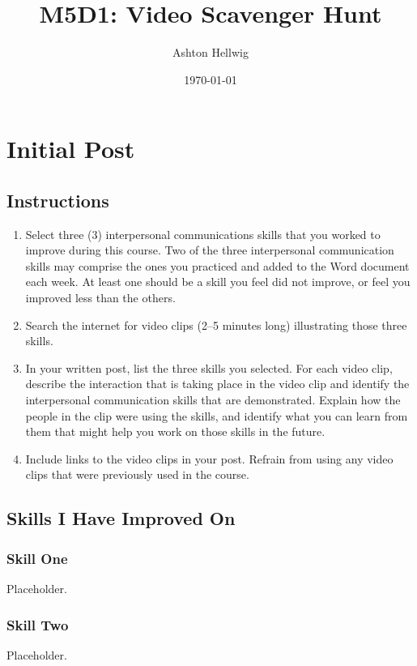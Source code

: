 \documentclass[stu,12pt]{apa7}
\title{%
    M5D1: Video Scavenger Hunt
  }
\author{Ashton Hellwig}
\date{\today}
\begin{document}
  \maketitle

  \section{Initial Post}
    \subsection*{Instructions}
      \begin{enumerate}
        \item Select three (3) interpersonal communications skills that you
          worked to improve during this course. Two of the three interpersonal
          communication skills may comprise the ones you practiced and added to
          the Word document each week. At least one should be a skill you feel
          did not improve, or feel you improved less than the others.
        \item Search the internet for video clips (2--5 minutes long)
          illustrating those three skills.
        \item In your written post, list the three skills you selected. For
          each video clip, describe the interaction that is taking place in the
          video clip and identify the interpersonal communication skills that
          are demonstrated. Explain how the people in the clip were using the
          skills, and identify what you can learn from them that might help you
          work on those skills in the future.
        \item Include links to the video clips in your post. Refrain from using
          any video clips that were previously used in the course.
      \end{enumerate}


    \newpage
    \subsection{Skills I Have Improved On}
      \subsubsection{Skill One}
        Placeholder.


      \subsubsection{Skill Two}
        Placeholder.
\end{document}
